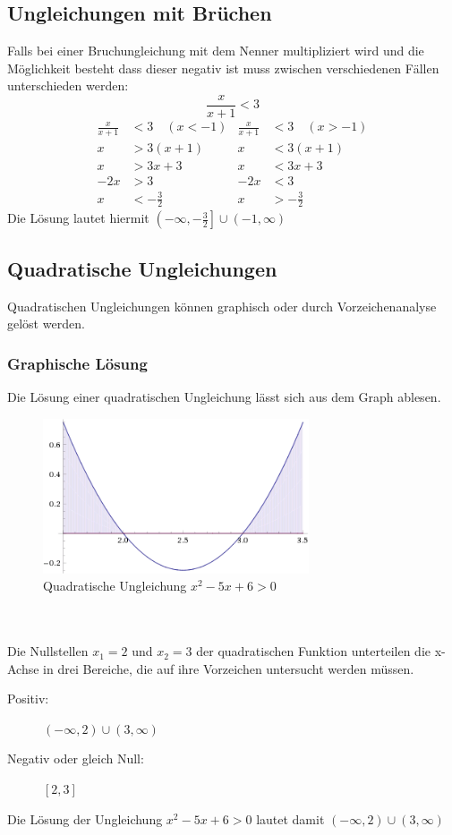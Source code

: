 \documentclass[a4paper]{article}
\begin{document}
\subsection{Ungleichungen mit Brüchen}
Falls bei einer Bruchungleichung mit dem Nenner multipliziert wird und die Möglichkeit besteht dass dieser negativ ist muss zwischen verschiedenen Fällen unterschieden werden:
\[
\frac{x}{x+1}<3
\]
\begin{align*}
\frac{x}{x+1}&<3 \quad (x<-1) & \frac{x}{x+1}&<3 \quad(x>-1) \\
x&>3(x+1) & x&<3(x+1) \\
x&>3x+3 & x&<3x+3 \\
-2x&>3 & -2x&<3 \\
x&<-\frac{3}{2} & x&>-\frac{3}{2}
\end{align*}
Die Lösung lautet hiermit ${\left(-\infty,-\frac{3}{2}\right]} \cup {\left({-1},\infty\right)}$

\subsection{Quadratische Ungleichungen}
Quadratischen Ungleichungen können graphisch oder durch Vorzeichenanalyse gelöst werden.
\subsubsection{Graphische Lösung}
Die Lösung einer quadratischen Ungleichung lässt sich aus dem Graph ablesen.
\begin{figure}[h!]
\centering
\includegraphics[width=0.7\textwidth]{images/graph_quadr_ungleichung.png}\caption{\label{fig:graph_quadr_ungleichung}{Quadratische Ungleichung $x^2-5x+6>0$}}
\end{figure}
\\\\Die Nullstellen $x_1=2$ und $x_2=3$ der quadratischen Funktion unterteilen die x-Achse in drei Bereiche, die auf ihre Vorzeichen untersucht werden müssen.
\begin{description}
\item [Positiv:] ${(-\infty,2)} \cup {(3,\infty)}$
\item [Negativ oder gleich Null:] $[2,3]$
\end{description}
Die Lösung der Ungleichung $x^2-5x+6>0$ lautet damit ${(-\infty,2)} \cup {(3,\infty)}$
\end{document}
